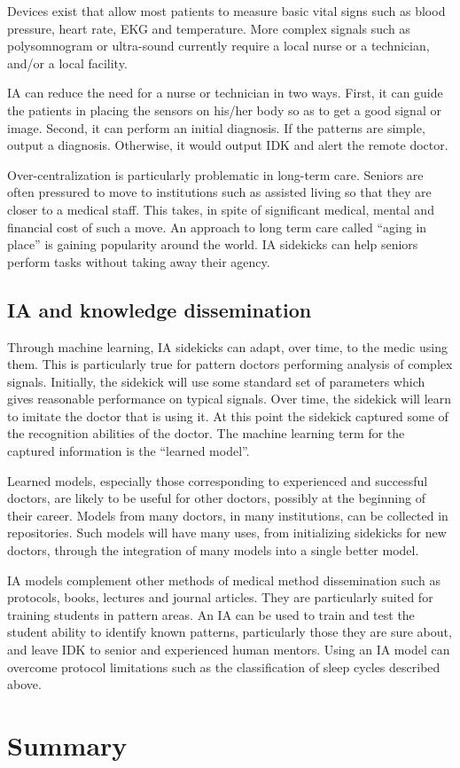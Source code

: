 \documentclass[11pt]{pnas-new}
\begin{document}
Devices exist that allow most patients to measure basic vital
signs such as blood pressure, heart rate, {\color{blue}EKG} and temperature. More complex
signals such as {\color{blue}polysomnogram} or ultra-sound currently require a local nurse or a
technician{\color{blue}, and/or a local facility}.

IA can reduce the need for a nurse or technician in two ways. First,
it can guide the patients in placing the sensors on his/her
body so as to get a good signal or image. Second, it can perform an
initial diagnosis. If the patterns are simple, output a diagnosis.
Otherwise, it would output IDK and alert the remote doctor.

Over-centralization is particularly problematic in long-term care.
Seniors are often pressured to move to institutions such as
assisted living so that they are closer to a medical staff. This {\color{blue}takes,} in
spite of significant medical, mental and financial cost of such a
move. An approach to long term care called ``aging in
place'' is gaining popularity around the world. IA sidekicks can help
seniors perform tasks without taking away their agency.


\subsection{IA and knowledge dissemination}

Through machine learning, IA sidekicks can adapt, over time, to the
medic using them. This is particularly true for pattern doctors
performing analysis of complex signals. Initially, the sidekick will
use some standard set of parameters which gives reasonable performance on
typical signals. Over time, the sidekick will learn to imitate the
doctor that is using it. At this point the sidekick captured some of
the recognition abilities of the doctor. The machine learning term for
the captured information is the ``learned model''.

Learned models, especially those corresponding to experienced and
successful doctors, are likely to be useful for other doctors,
possibly at the beginning of their career. Models from many doctors,
in many institutions, {\color{blue}can} be collected in repositories. Such models
will have many uses, from initializing sidekicks for new doctors,
through the integration of many models into a single better model.

IA models complement other methods of medical method dissemination
such as protocols, books, lectures and journal articles. They are
particularly suited for training students in pattern areas. An IA can
be used to train and test the student ability to identify known
patterns{\color{blue}, particularly those they are sure about, and leave IDK to senior and experienced human mentors}.  Using an IA model can overcome protocol limitations such as
the classification of sleep cycles described above.

\section{Summary}


% 

\end{document}
